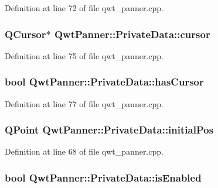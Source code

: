 Definition at line 72 of file qwt\-\_\-panner.\-cpp.

\hypertarget{class_qwt_panner_1_1_private_data_a7ed04561a57f6a416a8bf6ffe9c773d6}{
\subsubsection[{cursor}]{\setlength{\rightskip}{0pt plus 5cm}Q\-Cursor$\ast$ Qwt\-Panner\-::\-Private\-Data\-::cursor}}\label{class_qwt_panner_1_1_private_data_a7ed04561a57f6a416a8bf6ffe9c773d6}


Definition at line 75 of file qwt\-\_\-panner.\-cpp.

\hypertarget{class_qwt_panner_1_1_private_data_a6af0d50e5b0e949fc80ff95b563a44e4}{
\subsubsection[{has\-Cursor}]{\setlength{\rightskip}{0pt plus 5cm}bool Qwt\-Panner\-::\-Private\-Data\-::has\-Cursor}}\label{class_qwt_panner_1_1_private_data_a6af0d50e5b0e949fc80ff95b563a44e4}


Definition at line 77 of file qwt\-\_\-panner.\-cpp.

\hypertarget{class_qwt_panner_1_1_private_data_a5d50af61147132e2987947776ec30d82}{
\subsubsection[{initial\-Pos}]{\setlength{\rightskip}{0pt plus 5cm}Q\-Point Qwt\-Panner\-::\-Private\-Data\-::initial\-Pos}}\label{class_qwt_panner_1_1_private_data_a5d50af61147132e2987947776ec30d82}


Definition at line 68 of file qwt\-\_\-panner.\-cpp.

\hypertarget{class_qwt_panner_1_1_private_data_a4ed759d92567c9c2788c2a754273a6d5}{
\subsubsection[{is\-Enabled}]{\setlength{\rightskip}{0pt plus 5cm}bool Qwt\-Panner\-::\-Private\-Data\-::is\-Enabled}}\label{class_qwt_panner_1_1_private_data_a4ed759d92567c9c2788c2a754273a6d5}


